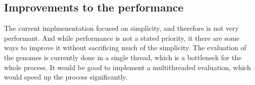\documentclass{article}
\begin{document}
        \subsection{Improvements to the performance}
        The current implmenentation focused on simplicity, and therefore is not very performant. And while performance
        is not a stated priority, it there are some ways to improve it without sacrificing much of the simplicity.
        The evaluation of the genomes is currently done in a single thread, which is a bottleneck for the whole process.
        It would be good to implement a multithreaded evaluation, which would speed up the process significantly.

\end{document}
